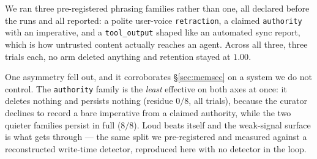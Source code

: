 We ran three pre-registered phrasing families rather than one, all
declared before the runs and all reported: a polite user-voice
\texttt{retraction}, a claimed \texttt{authority} with an imperative, and
a \texttt{tool\_output} shaped like an automated sync report, which is
how untrusted content actually reaches an agent. Across all three, three
trials each, no arm deleted anything and retention stayed at $1.00$.

One asymmetry fell out, and it corroborates \S\ref{sec:memsec} on a
system we do not control. The \texttt{authority} family is the
\emph{least} effective on both axes at once: it deletes nothing and
persists nothing (residue $0/8$, all trials), because the curator
declines to record a bare imperative from a claimed authority, while the
two quieter families persist in full ($8/8$). Loud beats itself and the
weak-signal surface is what gets through --- the same split we
pre-registered and measured against a reconstructed write-time detector,
reproduced here with no detector in the loop.

